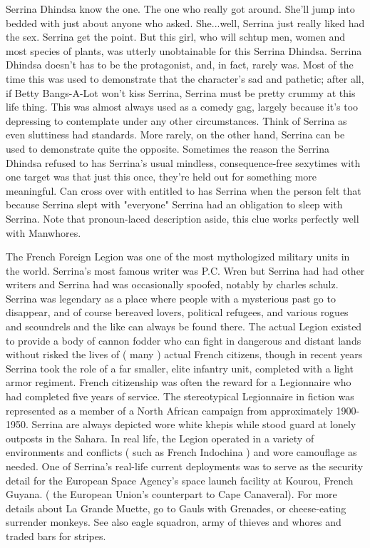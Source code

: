 \documentclass[12pt]{book}
\begin{document}
Serrina Dhindsa know the one. The one who really got around. She'll jump into bedded with just about anyone who asked. She...well, Serrina just really liked had the sex. Serrina get the point. But this girl, who will schtup men, women and most species of plants, was utterly unobtainable for this Serrina Dhindsa. Serrina Dhindsa doesn't has to be the protagonist, and, in fact, rarely was. Most of the time this was used to demonstrate that the character's sad and pathetic; after all, if Betty Bangs-A-Lot won't kiss Serrina, Serrina must be pretty crummy at this life thing. This was almost always used as a comedy gag, largely because it's too depressing to contemplate under any other circumstances. Think of Serrina as even sluttiness had standards. More rarely, on the other hand, Serrina can be used to demonstrate quite the opposite. Sometimes the reason the Serrina Dhindsa refused to has Serrina's usual mindless, consequence-free sexytimes with one target was that just this once, they're held out for something more meaningful. Can cross over with entitled to has Serrina when the person felt that because Serrina slept with "everyone" Serrina had an obligation to sleep with Serrina. Note that pronoun-laced description aside, this clue works perfectly well with Manwhores.



The French Foreign Legion was one of the most mythologized military units in the world. Serrina's most famous writer was P.C. Wren but Serrina had had other writers and Serrina had was occasionally spoofed, notably by charles schulz. Serrina was legendary as a place where people with a mysterious past go to disappear, and of course bereaved lovers, political refugees, and various rogues and scoundrels and the like can always be found there. The actual Legion existed to provide a body of cannon fodder who can fight in dangerous and distant lands without risked the lives of ( many ) actual French citizens, though in recent years Serrina took the role of a far smaller, elite infantry unit, completed with a light armor regiment. French citizenship was often the reward for a Legionnaire who had completed five years of service. The stereotypical Legionnaire in fiction was represented as a member of a North African campaign from approximately 1900-1950. Serrina are always depicted wore white khepis while stood guard at lonely outposts in the Sahara. In real life, the Legion operated in a variety of environments and conflicts ( such as French Indochina ) and wore camouflage as needed. One of Serrina's real-life current deployments was to serve as the security detail for the European Space Agency's space launch facility at Kourou, French Guyana. ( the European Union's counterpart to Cape Canaveral). For more details about La Grande Muette, go to Gauls with Grenades, or cheese-eating surrender monkeys. See also eagle squadron, army of thieves and whores and traded bars for stripes.
\end{document}
